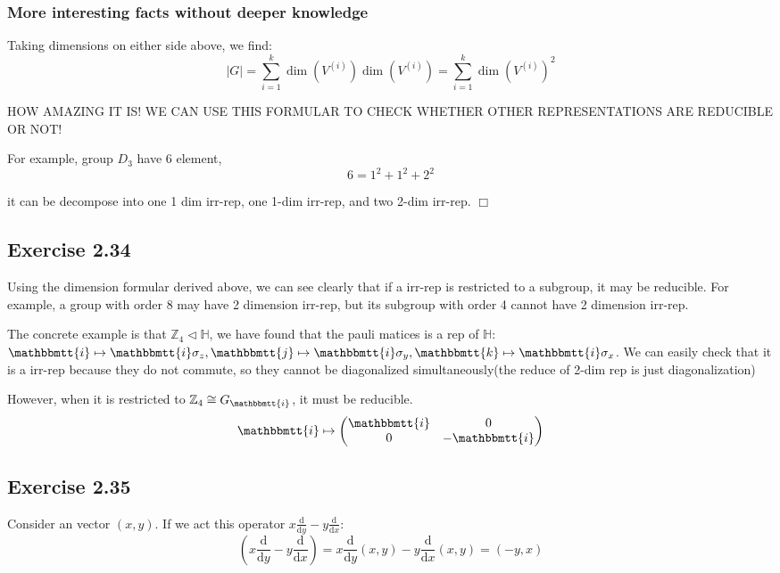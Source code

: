 \documentclass[]{ctexart}
\newcommand{\mi}{\mathbbmtt{i}}
\newcommand{\mj}{\mathbbmtt{j}}
\newcommand{\mk}{\mathbbmtt{k}}
\newcommand{\di}{\mathrm{d}}
\begin{document}
		\subsubsection{More interesting facts without deeper knowledge}
			Taking dimensions on either side above, we find:
				\begin{equation*}
				\lvert G\rvert=\sum\limits_{i=1}^k\dim\left(V^{(i)}\right)\dim\left(V^{(i)}\right)=\sum\limits_{i=1}^k\dim\left(V^{(i)}\right)^2
				\end{equation*}
			
			HOW AMAZING IT IS! WE CAN USE THIS FORMULAR TO CHECK WHETHER OTHER REPRESENTATIONS ARE REDUCIBLE OR NOT! 
			
			For example, group $D_3$ have 6 element, 
				\begin{equation*}
				6=1^2+1^2+2^2
				\end{equation*}
			
			it can be decompose into one 1 dim irr-rep, one 1-dim irr-rep, and two 2-dim irr-rep. \qquad $\Box$
	
	\subsection{Exercise 2.34}
		Using the dimension formular derived above, we can see clearly that if a irr-rep is restricted to a subgroup, it may be reducible. For example, a group with order 8 may have 2 dimension irr-rep, but its subgroup with order 4 cannot have 2 dimension irr-rep. 
		
		The concrete example is that $\mathbb{Z}_4\triangleleft\mathbb{H}$, we have found that the pauli matices is a rep of $\mathbb{H}$:$\mi\mapsto \mi\sigma_z,\mj\mapsto \mi\sigma_y,\mk\mapsto \mi\sigma_x$. We can easily check that it is a irr-rep because they do not commute, so they cannot be diagonalized simultaneously(the reduce of 2-dim rep is just diagonalization)
		
		However, when it is restricted to $\mathbb{Z}_4\cong G_{\mi}$, it must be reducible. 
			\begin{equation*}
				\mi\mapsto
				\begin{pmatrix}
				\mi & 0\\
				0 & -\mi
				\end{pmatrix}
			\end{equation*}
			
	\subsection{Exercise 2.35}
		Consider an vector $(x,y)$. If we act this operator $x\frac{\di}{\di y}-y\frac{\di}{\di x}$:
			\begin{equation*}
				(x\frac{\di}{\di y}-y\frac{\di}{\di x})=x\frac{\di}{\di y}(x,y)-y\frac{\di}{\di x}(x,y)=(-y,x)
			\end{equation*}
			
\end{document}

